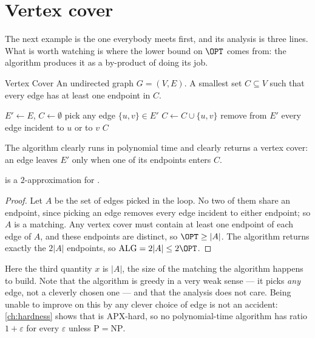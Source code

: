 \section{Vertex cover}
\label{sec:vertex-cover-approx}

The next example is the one everybody meets first, and its analysis is three
lines. What is worth watching is where the lower bound on $\OPT$ comes from:
the algorithm produces it as a by-product of doing its job.

\begin{probdef}{Vertex Cover}
  \instance An undirected graph $G = (V,E)$.
  \question A smallest set $C \subseteq V$ such that every edge has at least
  one endpoint in $C$.
\end{probdef}

\begin{algorithm}[ht]
\caption{$2$-approximation for }
\label{alg:vertex-cover}
\begin{algorithmic}[1]
  \State $E' \gets E$, \quad $C \gets \emptyset$
    \State pick any edge $\{u,v\} \in E'$
    \State $C \gets C \cup \{u,v\}$
    \State remove from $E'$ every edge incident to $u$ or to $v$
  \EndWhile
  \State \Return $C$
\end{algorithmic}
\end{algorithm}

The algorithm clearly runs in polynomial time and clearly returns a vertex
cover: an edge leaves $E'$ only when one of its endpoints enters $C$.

\begin{theorem}\label{thm:vertex-cover-approx}
 is a $2$-approximation for .
\end{theorem}

\begin{proof}
Let $A$ be the set of edges picked in the loop. No two of them share an
endpoint, since picking an edge removes every edge incident to either endpoint;
so $A$ is a matching. Any vertex cover must contain at least one endpoint of
each edge of $A$, and these endpoints are distinct, so $\OPT \ge |A|$. The
algorithm returns exactly the $2|A|$ endpoints, so
$\mathrm{ALG} = 2|A| \le 2\OPT$.
\end{proof}

Here the third quantity $x$ is $|A|$, the size of the matching the algorithm
happens to build. Note that the algorithm is greedy in a very weak sense --- it
picks \emph{any} edge, not a cleverly chosen one --- and that the analysis does
not care. Being unable to improve on this by any clever choice of edge is not
an accident: \cref{ch:hardness} shows that  is
\textrm{APX}-hard, so no polynomial-time algorithm has ratio $1 + \varepsilon$
for every $\varepsilon$ unless $\mathrm{P} = \mathrm{NP}$.


